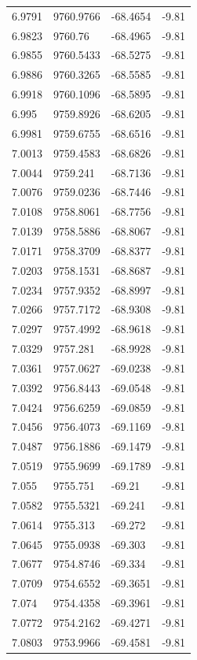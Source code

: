 \begin{table}[H]
\begin{tabular}{llll}
6.9791 & 9760.9766 & -68.4654 & -9.81 \\
6.9823 & 9760.76 & -68.4965 & -9.81 \\
6.9855 & 9760.5433 & -68.5275 & -9.81 \\
6.9886 & 9760.3265 & -68.5585 & -9.81 \\
6.9918 & 9760.1096 & -68.5895 & -9.81 \\
6.995 & 9759.8926 & -68.6205 & -9.81 \\
6.9981 & 9759.6755 & -68.6516 & -9.81 \\
7.0013 & 9759.4583 & -68.6826 & -9.81 \\
7.0044 & 9759.241 & -68.7136 & -9.81 \\
7.0076 & 9759.0236 & -68.7446 & -9.81 \\
7.0108 & 9758.8061 & -68.7756 & -9.81 \\
7.0139 & 9758.5886 & -68.8067 & -9.81 \\
7.0171 & 9758.3709 & -68.8377 & -9.81 \\
7.0203 & 9758.1531 & -68.8687 & -9.81 \\
7.0234 & 9757.9352 & -68.8997 & -9.81 \\
7.0266 & 9757.7172 & -68.9308 & -9.81 \\
7.0297 & 9757.4992 & -68.9618 & -9.81 \\
7.0329 & 9757.281 & -68.9928 & -9.81 \\
7.0361 & 9757.0627 & -69.0238 & -9.81 \\
7.0392 & 9756.8443 & -69.0548 & -9.81 \\
7.0424 & 9756.6259 & -69.0859 & -9.81 \\
7.0456 & 9756.4073 & -69.1169 & -9.81 \\
7.0487 & 9756.1886 & -69.1479 & -9.81 \\
7.0519 & 9755.9699 & -69.1789 & -9.81 \\
7.055 & 9755.751 & -69.21 & -9.81 \\
7.0582 & 9755.5321 & -69.241 & -9.81 \\
7.0614 & 9755.313 & -69.272 & -9.81 \\
7.0645 & 9755.0938 & -69.303 & -9.81 \\
7.0677 & 9754.8746 & -69.334 & -9.81 \\
7.0709 & 9754.6552 & -69.3651 & -9.81 \\
7.074 & 9754.4358 & -69.3961 & -9.81 \\
7.0772 & 9754.2162 & -69.4271 & -9.81 \\
7.0803 & 9753.9966 & -69.4581 & -9.81 \\

\end{tabular}
\end{table}
